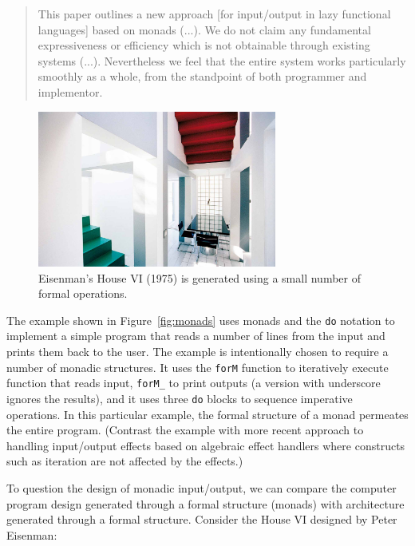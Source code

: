 \begin{quote}
This paper outlines a new approach [for input/output in lazy functional languages]
based on monads (...). We do not claim any fundamental expressiveness or efficiency
which is not obtainable through existing systems (...). Nevertheless we feel
that the entire system works particularly smoothly as a whole, from the standpoint
of both programmer and implementor.
\end{quote}


\begin{figure}
\centering
\vspace{-1em}
\includegraphics[width=0.7\textwidth]{fig/upsidedown.jpg}
\caption{Eisenman's House VI (1975) is generated using a small number of formal operations.}
\label{fig:upsidedown}
\end{figure}

The example shown in Figure~\ref{fig:monads} uses monads and the \texttt{do} notation to
implement a simple program that reads a number of lines from the input and prints them back
to the user. The example is intentionally chosen to require a number of monadic structures.
It uses the \texttt{forM} function to iteratively execute function that reads input,
\texttt{forM\_} to print outputs (a version with underscore ignores the results),
and it uses three \texttt{do} blocks to sequence imperative operations. In this particular
example, the formal structure of a monad permeates the entire program. (Contrast the example
with more recent approach to handling input/output effects based on algebraic effect handlers
where constructs such as iteration are not affected by the effects.)

To question the design of monadic input/output, we can compare the computer program design
generated through a formal structure (monads) with architecture generated through a formal
structure. Consider the House VI designed by Peter Eisenman:

